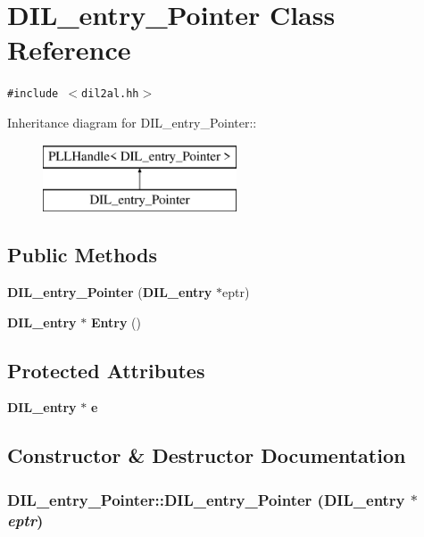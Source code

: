 \section{DIL\_\-entry\_\-Pointer  Class Reference}
\label{classDIL__entry__Pointer}
{\tt \#include $<$dil2al.hh$>$}

Inheritance diagram for DIL\_\-entry\_\-Pointer::\begin{figure}[H]
\begin{center}
\leavevmode
\includegraphics[height=2cm]{classDIL__entry__Pointer}
\end{center}
\end{figure}
\subsection*{Public Methods}
\begin{CompactItemize}
\item 
{\bf DIL\_\-entry\_\-Pointer} ({\bf DIL\_\-entry} $\ast$eptr)
\item 
{\bf DIL\_\-entry} $\ast$ {\bf Entry} ()
\end{CompactItemize}
\subsection*{Protected Attributes}
\begin{CompactItemize}
\item 
{\bf DIL\_\-entry} $\ast$ {\bf e}
\end{CompactItemize}


\subsection{Constructor \& Destructor Documentation}
\subsubsection{\setlength{\rightskip}{0pt plus 5cm}DIL\_\-entry\_\-Pointer::DIL\_\-entry\_\-Pointer ({\bf DIL\_\-entry} $\ast$ {\em eptr})\hspace{0.3cm}{\tt  [inline]}}\label{classDIL__entry__Pointer_a0}




